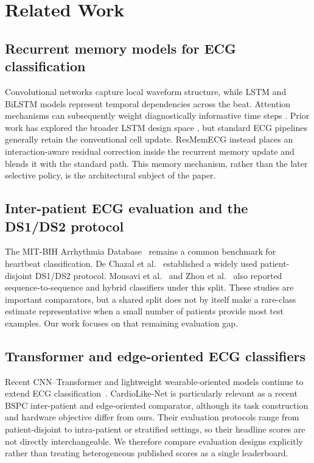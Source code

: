 \documentclass[review,12pt]{elsarticle}
\begin{document}
\section{Related Work}
\subsection{Recurrent memory models for ECG classification}
Convolutional networks capture local waveform structure, while LSTM and BiLSTM
models represent temporal dependencies across the beat. Attention mechanisms
can subsequently weight diagnostically informative time steps
\cite{RN8,RN16}. Prior work has explored the broader LSTM design space
\cite{RN10,RN11}, but standard ECG pipelines generally retain the conventional
cell update. ResMemECG instead places an interaction-aware residual correction
inside the recurrent memory update and blends it with the standard path. This
memory mechanism, rather than the later selective policy, is the architectural
subject of the paper.

\subsection{Inter-patient ECG evaluation and the DS1/DS2 protocol}
The MIT-BIH Arrhythmia Database~\cite{RN20} remains a common benchmark for
heartbeat classification. De Chazal et al.~\cite{RN21} established a widely
used patient-disjoint DS1/DS2 protocol. Mousavi et al.~\cite{ref29} and Zhou
et al.~\cite{ref30} also reported sequence-to-sequence and hybrid classifiers
under this split.
These studies are important comparators, but a shared split does not by itself
make a rare-class estimate representative when a small number of patients
provide most test examples. Our work focuses on that remaining evaluation gap.

\subsection{Transformer and edge-oriented ECG classifiers}
Recent CNN--Transformer and lightweight wearable-oriented models continue to
extend ECG classification~\cite{ref31,ref32,li2025modwpt,xu2026cardiolike}.
CardioLike-Net is particularly relevant as a recent BSPC inter-patient and
edge-oriented comparator, although its task construction and hardware objective
differ from ours. Their evaluation protocols range
from patient-disjoint to intra-patient or stratified settings, so their headline
scores are not directly interchangeable. We therefore compare evaluation
designs explicitly rather than treating heterogeneous published scores as a
single leaderboard.
\end{document}
